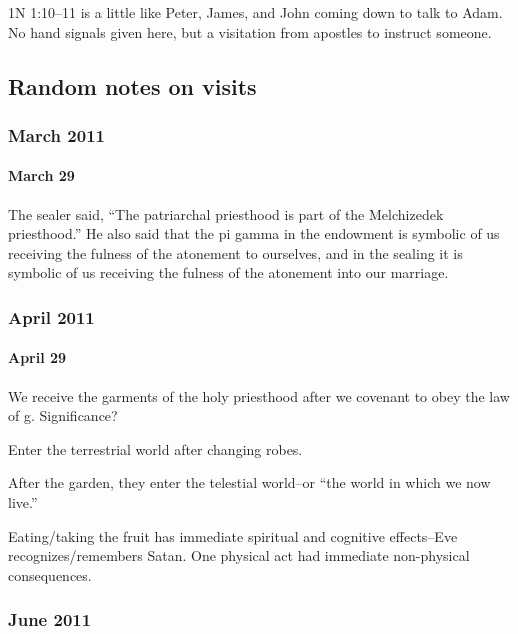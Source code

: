 		\begin{compactitem}
		\item 1N 1:10--11 is a little like Peter, James, and John coming down to talk to Adam. No hand signals given here, but a visitation from apostles to instruct someone.
		\end{compactitem}

	\subsection{Random notes on visits} %

		\subsubsection*{March 2011}

			\paragraph*{March 29} The sealer said, ``The patriarchal priesthood is part of the Melchizedek priesthood.'' He also said that the pi gamma in the endowment is symbolic of us receiving the fulness of the atonement to ourselves, and in the sealing it is symbolic of us receiving the fulness of the atonement into our marriage.

		\subsubsection*{April 2011}

			\paragraph*{April 29} We receive the garments of the holy priesthood after we covenant to obey the law of g. Significance?

				Enter the terrestrial world after changing robes.

				After the garden, they enter the telestial world--or ``the world in which we now live.''

				Eating/taking the fruit has immediate spiritual and cognitive effects--Eve recognizes/remembers Satan. One physical act had immediate non-physical consequences.

		\subsubsection*{June 2011}

